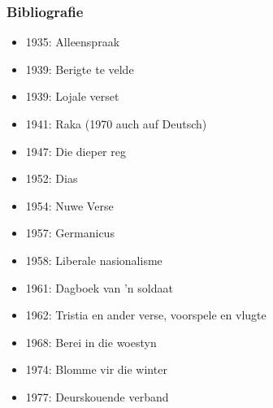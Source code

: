 \documentclass[8pt]{beamer}
\begin{document}
\begin{frame}
	\frametitle{Bibliografie}
	\center
	\begin{itemize}
		\item
	1935: Alleenspraak
		\item
	1939: Berigte te velde
		\item
	1939: Lojale verset
		\item
	1941: Raka (1970 auch auf Deutsch)
		\item
	1947: Die dieper reg
		\item
	1952: Dias
		\item
	1954: Nuwe Verse
		\item
	1957: Germanicus
		\item
	1958: Liberale nasionalisme
		\item
	1961: Dagboek van ’n soldaat
		\item
	1962: Tristia en ander verse, voorspele en vlugte
		\item
	1968: Berei in die woestyn
		\item
	1974: Blomme vir die winter
		\item
	1977: Deurskouende verband
	\end{itemize}
\end{frame}
\end{document}
